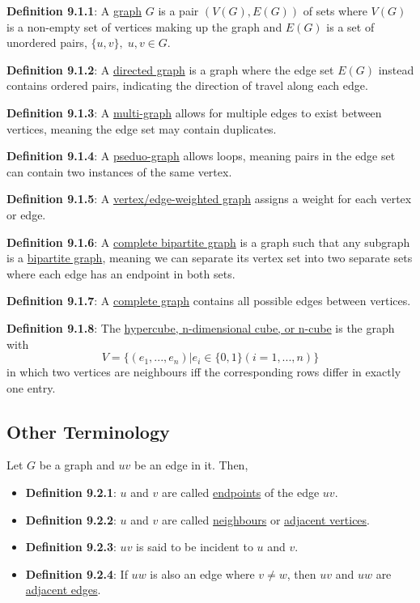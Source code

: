 \documentclass{article}
\newcommand{\separate}[1] {\vspace{#1 pt}\noindent}
\newcommand{\definition}[2]{\textbf{Definition #1}: #2\label{def:#1}}
\begin{document}
\definition{9.1.1}{A \underline{graph} \(G\) is a pair \((V(G), E(G))\) of sets where \(V(G)\) is a non-empty set of vertices making up the graph and \(E(G)\) is a set of unordered pairs, \(\{u,v\}, \;u,v\in G\).}

\separate{7}\definition{9.1.2}{A \underline{directed graph} is a graph where the edge set \(E(G)\) instead contains ordered pairs, indicating the direction of travel along each edge.}

\separate{7}\definition{9.1.3}{A \underline{multi-graph} allows for multiple edges to exist between vertices, meaning the edge set may contain duplicates.}

\separate{7}\definition{9.1.4}{A \underline{pseduo-graph} allows loops, meaning pairs in the edge set can contain two instances of the same vertex.}

\separate{7}\definition{9.1.5}{A \underline{vertex/edge-weighted graph} assigns a weight for each vertex or edge.}

\separate{7}\definition{9.1.6}{A \underline{complete bipartite graph} is a graph such that any subgraph is a \underline{bipartite graph}, meaning we can separate its vertex set into two separate sets where each edge has an endpoint in both sets.}

\separate{7}\definition{9.1.7}{A \underline{complete graph} contains all possible edges between vertices.}

\separate{7}\definition{9.1.8}{The \underline{hypercube, n-dimensional cube, or n-cube} is the graph with
\begin{equation}
    V = \{(e_1,...,e_n) | e_i \in \{0,1\} (i=1,...,n)\}
\end{equation}
in which two vertices are neighbours iff the corresponding rows differ in exactly one entry.}

\subsection{Other Terminology}

Let \(G\) be a graph and \(uv\) be an edge in it. Then,
\begin{itemize}
    \item \definition{9.2.1}{\(u\) and \(v\) are called \underline{endpoints} of the edge \(uv\).}
    \item \definition{9.2.2}{\(u\) and \(v\) are called \underline{neighbours} or \underline{adjacent vertices}.}
    \item \definition{9.2.3}{\(uv\) is said to be incident to \(u\) and \(v\).}
    \item \definition{9.2.4}{If \(uw\) is also an edge where \(v\neq w\), then \(uv\) and \(uw\) are \underline{adjacent edges}.}
\end{itemize}
\end{document}
